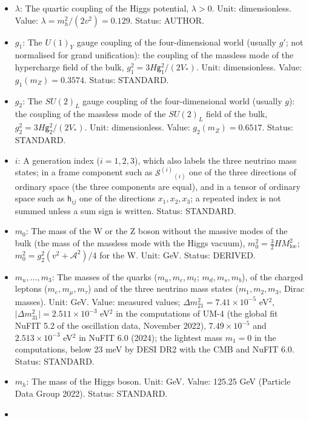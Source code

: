 \documentclass[
  10pt,
]{article}
\begin{document}
\begin{itemize}
  DERIVED.
\item
  \(\lambda\): The quartic coupling of the Higgs potential,
  \(\lambda > 0\). Unit: dimensionless. Value:
  \(\lambda = m_h^2/(2v^2) = 0.129\). Status: AUTHOR.
\item
  \(g_1\): The \(U(1)_Y\) gauge coupling of the four-dimensional world
  (usually \(g'\); not normalised for grand unification): the coupling
  of the massless mode of the hypercharge field of the bulk,
  \(g_1^2 = 3H\mathsf{g}_1^2/(2V_*)\). Unit: dimensionless. Value:
  \(g_1(m_Z) = 0.3574\). Status: STANDARD.
\item
  \(g_2\): The \(SU(2)_L\) gauge coupling of the four-dimensional world
  (usually \(g\)): the coupling of the massless mode of the \(SU(2)_L\)
  field of the bulk, \(g_2^2 = 3H\mathsf{g}_2^2/(2V_*)\). Unit:
  dimensionless. Value: \(g_2(m_Z) = 0.6517\). Status: STANDARD.
\item
  \(i\): A generation index (\(i = 1, 2, 3\)), which also labels the
  three neutrino mass states; in a frame component such as
  \(\mathcal{S}^{(i)}{}_{(i)}\) one of the three directions of ordinary
  space (the three components are equal), and in a tensor of ordinary
  space such as \(\mathsf{h}_{ij}\) one of the directions
  \(x_1, x_2, x_3\); a repeated index is not summed unless a sum sign is
  written. Status: STANDARD.
\item
  \(m_0\): The mass of the W or the Z boson without the massive modes of
  the bulk (the mass of the massless mode with the Higgs vacuum),
  \(m_0^2 = \frac32HM_{\mathrm{loc}}^2\);
  \(m_0^2 = g_2^2(v^2 + \mathcal{A}^2)/4\) for the W. Unit: GeV. Status:
  DERIVED.
\item
  \(m_u, \dots, m_3\): The masses of the quarks (\(m_u, m_c, m_t\);
  \(m_d, m_s, m_b\)), of the charged leptons (\(m_e, m_\mu, m_\tau\))
  and of the three neutrino mass states (\(m_1, m_2, m_3\), Dirac
  masses). Unit: GeV. Value: measured values;
  \(\Delta m_{21}^2 = 7.41\times10^{-5}\) eV\(^2\),
  \(\lvert\Delta m_{31}^2\rvert = 2.511\times10^{-3}\) eV\(^2\) in the
  computations of UM-4 (the global fit NuFIT 5.2 of the oscillation
  data, November 2022), \(7.49\times10^{-5}\) and \(2.513\times10^{-3}\)
  eV\(^2\) in NuFIT 6.0 (2024); the lightest mass \(m_1 = 0\) in the
  computations, below 23 meV by DESI DR2 with the CMB and NuFIT 6.0.
  Status: STANDARD.
\item
  \(m_h\): The mass of the Higgs boson. Unit: GeV. Value: 125.25 GeV
  (Particle Data Group 2022). Status: STANDARD.
\item

\end{itemize}
\end{document}
